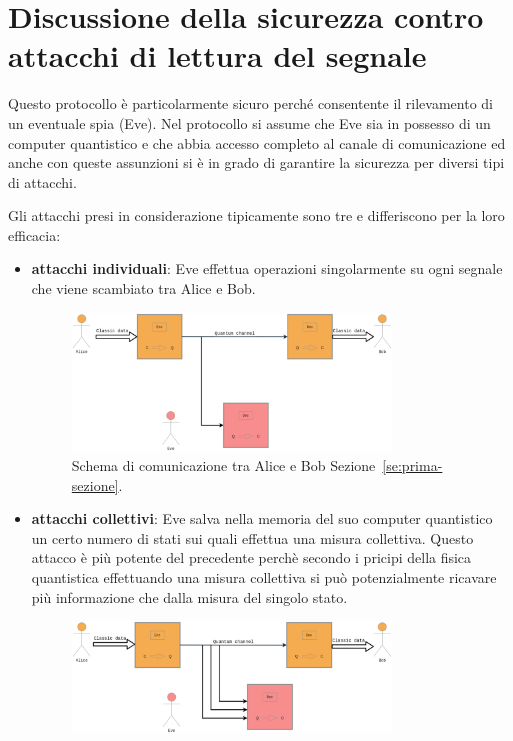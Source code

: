 \section{Discussione della sicurezza contro attacchi di lettura del segnale}
Questo protocollo \`e particolarmente sicuro perch\'e consentente il rilevamento di un eventuale spia (Eve). Nel protocollo si assume che Eve sia in possesso di un computer quantistico e che abbia accesso completo al canale di comunicazione ed anche con queste assunzioni si \`e in grado di garantire la sicurezza per diversi tipi di attacchi.

Gli attacchi presi in considerazione tipicamente sono tre e differiscono per la loro efficacia:
\begin{itemize}
\item \textbf{attacchi individuali}: Eve effettua operazioni singolarmente su ogni segnale che viene scambiato tra Alice e Bob. 
\begin{figure}[tbp] 
\begin{center}
\includegraphics[width=0.8\textwidth]{figure/individual_attack.eps} 
\end{center}
\caption{Schema di comunicazione tra Alice e Bob Sezione~\ref{se:prima-sezione}.} \label{fig:figura-doppia}
\end{figure}
\item \textbf{attacchi collettivi}: Eve salva nella memoria del suo computer quantistico un certo numero di stati sui quali effettua una misura collettiva. Questo attacco \`e pi\`u potente del precedente perch\`e secondo i pricipi della fisica quantistica effettuando una misura collettiva si pu\`o potenzialmente ricavare pi\`u informazione che dalla misura del singolo stato.
\begin{figure}[tbp] 
\begin{center}
\includegraphics[width=0.8\textwidth]{figure/collective_attack.eps} 

\end{center}
\end{figure}
\end{itemize}
